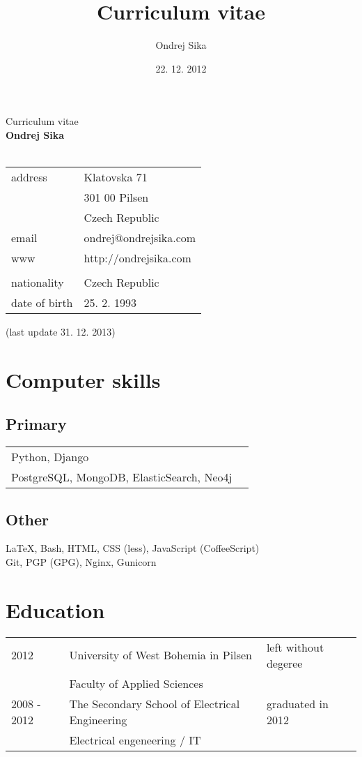\documentclass[12pt,a4paper]{article}
\title{Curriculum vitae}
\author{Ondrej Sika}
\date{22. 12. 2012}
\begin{document}
\begin{center}
{\Large Curriculum vitae}\\
\vspace*{1cm}
{\LARGE \bf Ondrej Sika}\\
\hrulefill\\
\vspace*{0.2cm}
\begin{tabular}{l l}
address & Klatovska 71\\
 & 301 00 Pilsen\\
 & Czech Republic\\
email & ondrej@ondrejsika.com\\
www & http://ondrejsika.com\\
\\
nationality & Czech Republic\\
date of birth & 25. 2. 1993\\
\end{tabular}

\vspace*{0.2cm}
{\small (last update 31. 12. 2013)}
\end{center}

\section*{Computer skills}
\subsection*{Primary}
\begin{tabular}{@{}ll}
Python, Django & \\
PostgreSQL, MongoDB, ElasticSearch, Neo4j & \\
\end{tabular}

\subsection*{Other}
LaTeX, Bash, HTML, CSS (less), JavaScript (CoffeeScript)\\
Git, PGP (GPG), Nginx, Gunicorn\\

\section*{Education}
\begin{tabular}{@{}p{2cm}ll}
2012  & University of West Bohemia in Pilsen  & left without degeree\\
 & Faculty of Applied Sciences & \\
2008 - 2012 & The Secondary School of Electrical Engineering & graduated in 2012\\
 & Electrical engeneering / IT & \\
\end{tabular}
\end{document}
